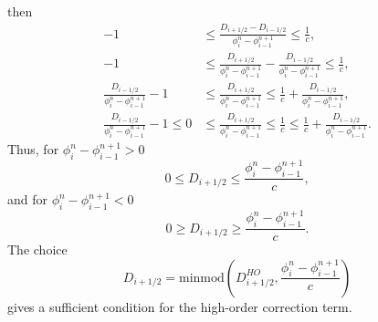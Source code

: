 \documentclass[../thesis.tex]{subfiles}
\begin{document}
then
\begin{equation}
    \begin{split}
        -1
        &\leq
        \frac{D_{i+1/2} - D_{i-1/2}}
        {\phi_{i}^{n} - \phi_{i-1}^{n+1}}
        \leq
        \frac{1}{c},
        \\
        -1
        &\leq
        \frac{D_{i+1/2}}
        {\phi_{i}^{n} - \phi_{i-1}^{n+1}}
        -\frac{D_{i-1/2}}
        {\phi_{i}^{n} - \phi_{i-1}^{n+1}}
        \leq
        \frac{1}{c},
        \\
        \frac{D_{i-1/2}}
        {\phi_{i}^{n} - \phi_{i-1}^{n+1}}-1
        &\leq
        \frac{D_{i+1/2}}
        {\phi_{i}^{n} - \phi_{i-1}^{n+1}}
        \leq
        \frac{1}{c}
        +\frac{D_{i-1/2}}
        {\phi_{i}^{n} - \phi_{i-1}^{n+1}},
        \\
        \frac{D_{i-1/2}}
        {\phi_{i}^{n} - \phi_{i-1}^{n+1}}-1
        \leq
        0
        &\leq
        \frac{D_{i+1/2}}
        {\phi_{i}^{n} - \phi_{i-1}^{n+1}}
        \leq
        \frac{1}{c}
        \leq
        \frac{1}{c}
        +\frac{D_{i-1/2}}
        {\phi_{i}^{n} - \phi_{i-1}^{n+1}}.
    \end{split}
\end{equation}
Thus, for \(\phi_{i}^{n} - \phi_{i-1}^{n+1} > 0\)
\begin{equation}
    0
    \leq
    D_{i+1/2}
    \leq
    \frac{\phi_{i}^{n} - \phi_{i-1}^{n+1}}{c},
\end{equation}
and for \(\phi_{i}^{n} - \phi_{i-1}^{n+1} < 0\)
\begin{equation}
    0
    \geq
    D_{i+1/2}
    \geq
    \frac{\phi_{i}^{n} - \phi_{i-1}^{n+1}}{c}.
\end{equation}
The choice
\begin{equation}
    D_{i+1/2} = \mbox{minmod}\left(
        D_{i+1/2}^{HO},
        \frac{\phi_{i}^{n} - \phi_{i-1}^{n+1}}{c}
    \right)
\end{equation}
gives a sufficient condition for the high-order correction term.
\end{document}
